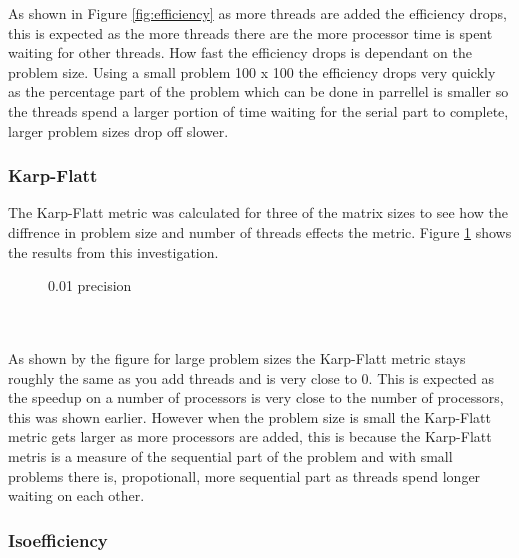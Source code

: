 \documentclass{article}
\begin{document}
As shown in Figure \ref{fig:efficiency} as more threads are added the efficiency
drops, this is expected as the more threads there are the more processor time is
spent waiting for other threads. How fast the efficiency drops is dependant on
the problem size. Using a small problem 100 x 100 the efficiency drops very quickly
as the percentage part of the problem which can be done in parrellel is smaller
so the threads spend a larger portion of time waiting for the serial part to complete, larger
problem sizes drop off slower.

\subsubsection{Karp-Flatt}

The Karp-Flatt metric was calculated for three of the matrix sizes to see how the
diffrence in problem size and number of threads effects the metric. Figure \ref{fig:karpflatt}
shows the results from this investigation.

\begin{figure}[H]
 \centering
 \caption{0.01 precision}
 \label{fig:karpflatt}
\end{figure}\\~\\

As shown by the figure for large problem sizes the Karp-Flatt metric stays roughly
the same as you add threads and is very close to 0. This is expected as the speedup on
a number of processors is very close to the number of processors, this was shown
earlier. However when the problem size is small the Karp-Flatt metric gets larger
as more processors are added, this is because the Karp-Flatt metris is a measure of
the sequential part of the problem and with small problems there is, propotionall,
more sequential part as threads spend longer waiting on each other.

\subsubsection{Isoefficiency}
\end{document}
